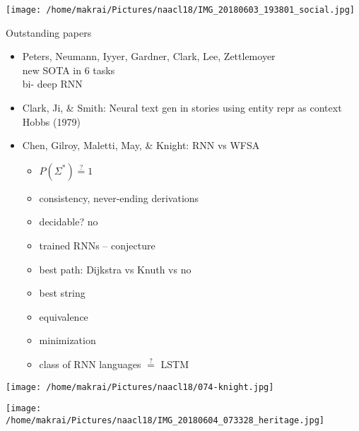 \documentclass{beamer}
\begin{document}
  \begin{frame}
    \texttt{[image: /home/makrai/Pictures/naacl18/IMG\_20180603\_193801\_social.jpg]}
  \end{frame}


\begin{frame}[allowframebreaks]{Outstanding papers}
  \begin{itemize} 
    \item Peters, Neumann, Iyyer, Gardner, Clark, Lee, Zettlemoyer
      \\ new SOTA in 6 tasks
      \\ bi- deep RNN
    \item Clark, Ji, \& Smith: Neural text gen in stories using entity repr as context
      \\ Hobbs (1979)
    \item Chen, Gilroy, Maletti, May, \& Knight: RNN vs WFSA
      \begin{itemize}
        \item $P(\Sigma^*) \stackrel{?}{=} 1$
        \item consistency, never-ending derivations
        \item decidable? no
        \item trained RNNs -- conjecture
        \item best path: Dijkstra vs Knuth vs no
        \item best string
        \item equivalence
        \item minimization
        \item class of RNN languages $\stackrel ?=$ LSTM
      \end{itemize}
  \end{itemize}
  \texttt{[image: /home/makrai/Pictures/naacl18/074-knight.jpg]}
\end{frame}

\begin{frame}
  \texttt{[image: /home/makrai/Pictures/naacl18/IMG\_20180604\_073328\_heritage.jpg]}
\end{frame}
\end{document}
